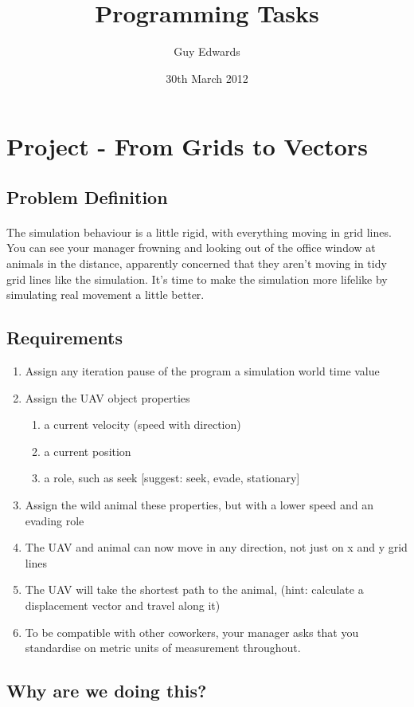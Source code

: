 \documentclass[11pt]{book}
\title{\textbf{Programming Tasks}}
\author{Guy Edwards}
\date{30th March 2012}
\begin{document}
\section{Project - From Grids to Vectors}

\subsection{Problem Definition}

\paragraph{}  The simulation behaviour is a little rigid, with everything
moving in grid lines. You can see your manager frowning and looking out of the
office window at animals in the distance, apparently concerned that they
aren't moving in tidy grid lines like the simulation. It's time to make the
simulation more lifelike by simulating real movement a little better.

\subsection{Requirements}
\begin{enumerate}
\item Assign any iteration pause of the program a simulation world time value
\item Assign the UAV object properties
    \begin{enumerate}
    \item a current velocity (speed with direction)
    \item a current position
    \item a role, such as seek [suggest: seek, evade, stationary]
    \end{enumerate}
\item Assign the wild animal these properties, but with a lower speed and an evading role
\item The UAV and animal can now move in any direction, not just on x and y grid lines
\item The UAV will take the shortest path to the animal, (hint: calculate a displacement vector and travel along it)
\item To be compatible with other coworkers, your manager asks that you standardise on metric units of measurement throughout.
\end{enumerate}

\subsection{Why are we doing this?}
\end{document}
